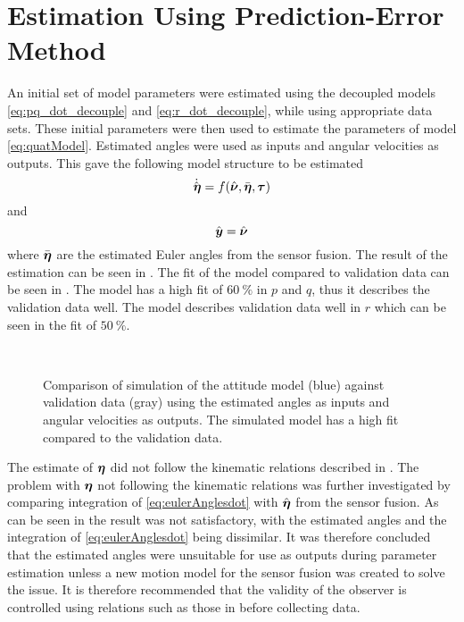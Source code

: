 \section{Estimation Using Prediction-Error Method}\label{sec:estimPEM}  
An initial set of model parameters were estimated using the decoupled models \eqref{eq:pq_dot_decouple} and \eqref{eq:r_dot_decouple}, while using appropriate data sets. These initial parameters were then used to estimate the parameters of model \eqref{eq:quatModel}. Estimated angles were used as inputs and angular velocities as outputs. This gave the following model structure to be estimated
\begin{equation}
\dot{\hat{\boldsymbol{\eta}}} = f(\hat{\boldsymbol{\nu}}, \bar{\boldsymbol{\eta}}, \boldsymbol{\tau})
\end{equation}
and
\begin{equation}
\hat{\boldsymbol{y}} = \hat{\boldsymbol{\nu}}
\end{equation}
where $\bar{\boldsymbol{\eta}}$ are the estimated Euler angles from the sensor fusion.
The result of the estimation can be seen in . The fit of the model compared to validation data can be seen in . The model has a high fit of $60\ \%$ in $p$ and $q$, thus it describes the validation data well. The model describes validation data well in $r$ which can be seen in the fit of $50\ \%$.
\begin{figure}[tbp]
  \centering
  \qquad
  \\
  \caption{\label{fig:velocityCompareCong}%
    Comparison of simulation of the attitude model (blue) against validation data (gray) using the estimated angles as inputs and angular velocities as outputs. The simulated model has a high fit compared to the validation data.}
\end{figure}

The estimate of $\boldsymbol{\eta}$ did not follow the kinematic relations described in . The problem with $\boldsymbol{\eta}$ not following the kinematic relations was further investigated by comparing integration of \eqref{eq:eulerAnglesdot} with $\hat{\boldsymbol{\eta}}$ from the sensor fusion. As can be seen in  the result was not satisfactory, with the estimated angles and the integration of \eqref{eq:eulerAnglesdot} being dissimilar. It was therefore concluded that the estimated angles were unsuitable for use as outputs during parameter estimation unless a new motion model for the sensor fusion was created to solve the issue. It is therefore recommended that the validity of the observer is controlled using relations such as those in  before collecting data. 

